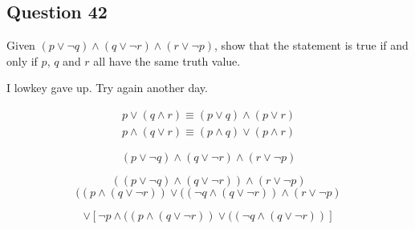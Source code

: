 \documentclass[12pt]{article}
\begin{document}
\subsection*{Question 42}
Given $(p \lor \neg q) \land (q \lor \neg r) \land (r \lor \neg p)$, show that
the statement is true if and only if $p$, $q$ and $r$ all have the same truth
value.

I lowkey gave up. Try again another day.

\begin{align*}
  p \lor (q \land r) \equiv (p \lor q) \land (p \lor r)\\
  p \land (q \lor r) \equiv (p \land q) \lor (p \land r)
\end{align*}

\begin{equation}
  (p \lor \neg q) \land (q \lor \neg r) \land (r \lor \neg p)
\end{equation}

\begin{equation}
  ((p \lor \neg q) \land (q \lor \neg r)) \land (r \lor \neg p)
\end{equation}
\begin{equation}
((p \land (q \lor \neg r)) \lor ((\neg q \land (q \lor \neg r)) \land (r \lor \neg p)
\end{equation}

\begin{equation}
  [
    r \land ((p \land (q \lor \neg r))
    \lor ((\neg q \land (q \lor \neg r))
  ] 
  \lor [
    \neg p \land ((p \land (q \lor \neg r)) 
    \lor ((\neg q \land (q \lor \neg r))
  ]
\end{equation}

\end{document}
